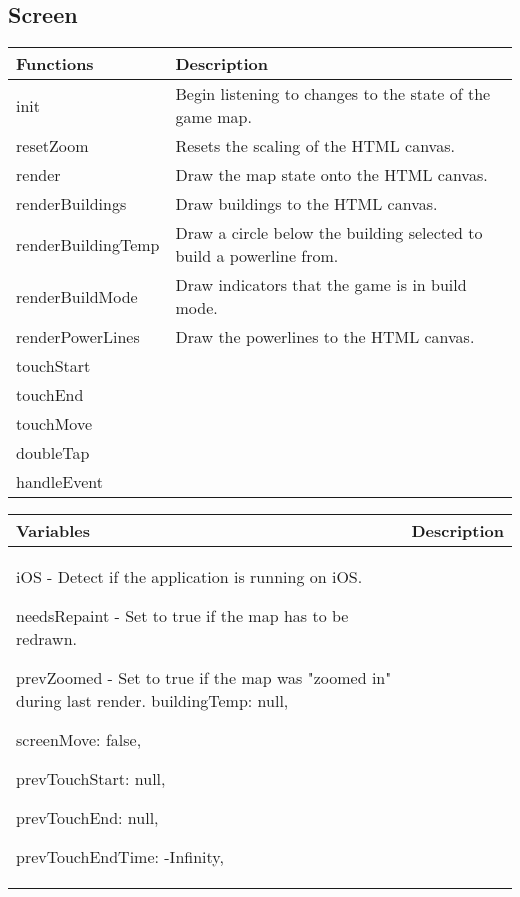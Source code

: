 \subsection*{Screen}

	\begin{table}[H]
	\begin{tabular}{p{4cm} | p{8cm} }
	\hline
	\rowcolor{gray}
	Functions & Description \\ \hline
	init & Begin listening to changes to the state of the game map. \\ \hline
	resetZoom & Resets the scaling of the HTML canvas. \\ \hline
	render & Draw the map state onto the HTML canvas. \\ \hline
	renderBuildings & Draw buildings to the HTML canvas. \\ \hline
	renderBuildingTemp & Draw a circle below the building selected to build a powerline from. \\ \hline
	renderBuildMode & Draw indicators that the game is in build mode. \\ \hline
	renderPowerLines & Draw the powerlines to the HTML canvas. \\ \hline
  	touchStart & \\ \hline

  	touchEnd & \\ \hline

  	touchMove & \\ \hline

  	doubleTap & \\ \hline

  	handleEvent
	\end{tabular}
	\end{table}

	\begin{table}[H]
	\begin{tabular}{p{4cm} | p{8cm} }
	\hline
	\rowcolor{gray}
	Variables & Description \\ \hline
	iOS - Detect if the application is running on iOS.

	needsRepaint - Set to true if the map has to be redrawn.

	prevZoomed - Set to true if the map was "zoomed in" during last render.
	buildingTemp: null,

  	screenMove: false,

  	prevTouchStart: null,

 	prevTouchEnd: null,

  	prevTouchEndTime: -Infinity,

	\end{tabular}
	\end{table}

